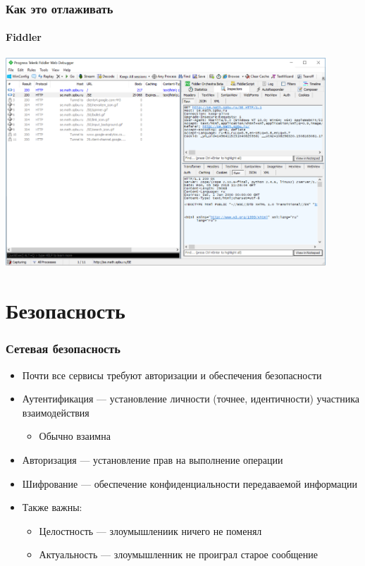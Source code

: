 \documentclass{../../slides-style}
\begin{document}
    \begin{frame}
        \frametitle{Как это отлаживать}
        \framesubtitle{Fiddler}
        \begin{center}
            \includegraphics[width=0.9\textwidth]{fiddler.png}
        \end{center}
    \end{frame}

    \section{Безопасность}

    \begin{frame}
        \frametitle{Сетевая безопасность}
        \begin{itemize}
            \item Почти все сервисы требуют авторизации и обеспечения безопасности
            \item Аутентификация --- установление личности (точнее, идентичности) участника взаимодействия
            \begin{itemize}
                \item Обычно взаимна
            \end{itemize}
            \item Авторизация --- установление прав на выполнение операции
            \item Шифрование --- обеспечение конфиденциальности передаваемой информации
            \item Также важны:
            \begin{itemize}
                \item Целостность --- злоумышлениик ничего не поменял
                \item Актуальность --- злоумышленник не проиграл старое сообщение
            \end{itemize} 
        \end{itemize}
    \end{frame}
\end{document}
